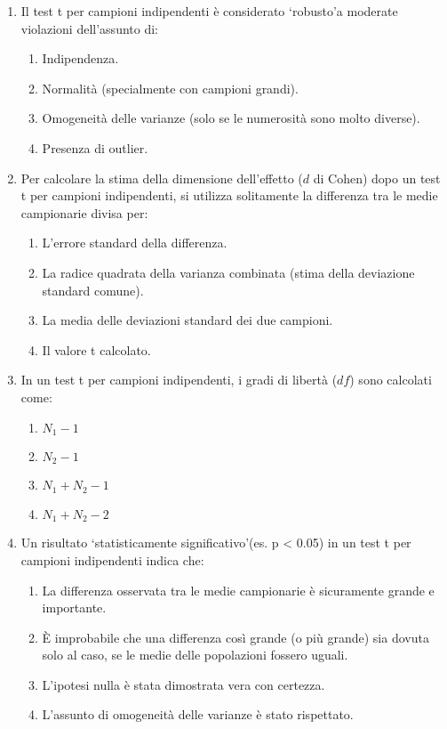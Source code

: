 \documentclass[12pt, a4paper]{article}
\begin{document}
\begin{enumerate}
    \item Il test t per campioni indipendenti è considerato   `robusto'a moderate violazioni dell'assunto di:
    \begin{enumerate}
        \item Indipendenza.
        \item Normalità (specialmente con campioni grandi).
        \item Omogeneità delle varianze (solo se le numerosità sono molto diverse).
        \item Presenza di outlier.
    \end{enumerate}

    \item Per calcolare la stima della dimensione dell'effetto ($d$ di Cohen) dopo un test t per campioni indipendenti, si utilizza solitamente la differenza tra le medie campionarie divisa per:
    \begin{enumerate}
        \item L'errore standard della differenza.
        \item La radice quadrata della varianza combinata (stima della deviazione standard comune).
        \item La media delle deviazioni standard dei due campioni.
        \item Il valore t calcolato.
    \end{enumerate}

    \item In un test t per campioni indipendenti, i gradi di libertà ($df$) sono calcolati come:
    \begin{enumerate}
        \item $N_1 - 1$
        \item $N_2 - 1$
        \item $N_1 + N_2 - 1$
        \item $N_1 + N_2 - 2$
    \end{enumerate}

    \item Un risultato   `statisticamente significativo'(es. p < 0.05) in un test t per campioni indipendenti indica che:
    \begin{enumerate}
        \item La differenza osservata tra le medie campionarie è sicuramente grande e importante.
        \item È improbabile che una differenza così grande (o più grande) sia dovuta solo al caso, se le medie delle popolazioni fossero uguali.
        \item L'ipotesi nulla è stata dimostrata vera con certezza.
        \item L'assunto di omogeneità delle varianze è stato rispettato.
    \end{enumerate}


\end{enumerate}
\end{document}
